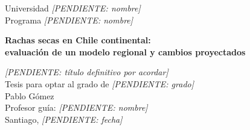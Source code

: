 \documentclass[12pt,a4paper,oneside]{report}
\newcommand{\pendiente}[1]{{\color{red!70!black}\itshape [PENDIENTE: #1]}}
\newif\ifhojaderuta
\begin{document}
\begin{titlepage}
  \centering
  \vspace*{2cm}
  {\Large Universidad \pendiente{nombre}}\\[0.5cm]
  {\large Programa \pendiente{nombre}}\\[3cm]
  {\LARGE\bfseries Rachas secas en Chile continental:\\[0.3cm]
   evaluación de un modelo regional y cambios proyectados\par}
  \vspace{1cm}
  {\large \pendiente{título definitivo por acordar}}\\[3cm]
  {\large Tesis para optar al grado de \pendiente{grado}}\\[2cm]
  {\large Pablo Gómez}\\[0.5cm]
  {\large Profesor guía: \pendiente{nombre}}\\[2cm]
  {\large Santiago, \pendiente{fecha}}
\end{titlepage}

\ifhojaderuta
  
\fi


\tableofcontents
\listoffigures
\listoftables

\cleardoublepage
{}









\nocite{*}



\appendix


\end{document}

